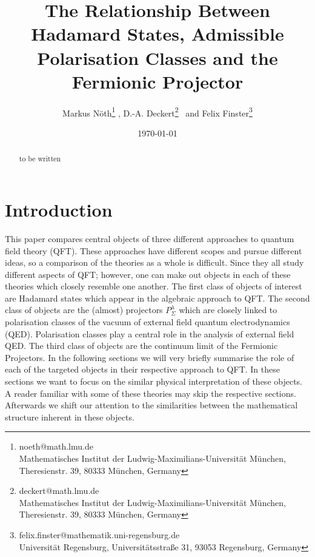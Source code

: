 \documentclass[a4paper,11pt]{article}
\begin{document}
\title{The Relationship Between Hadamard States, Admissible Polarisation Classes and the Fermionic Projector}

\author{Markus Nöth\thanks{noeth@math.lmu.de \\\tiny{Mathematisches Institut der Ludwig-Maximilians-Universit\"at M\"unchen,}
    \tiny{Theresienstr. 39, 80333 M\"unchen, Germany}}
	,
D.-A. Deckert\thanks{deckert@math.lmu.de \\ \tiny{Mathematisches Institut der Ludwig-Maximilians-Universit\"at M\"unchen,}
    \tiny{Theresienstr. 39, 80333 M\"unchen, Germany}}
	 ~and
Felix Finster\thanks{felix.finster@mathematik.uni-regensburg.de \\     \tiny{Universität Regensburg, Universitätsstraße 31, 93053 Regensburg, Germany}}
}
\date{\today}



\maketitle

\begin{abstract}
to be written
\end{abstract}

\section{Introduction}
This paper compares central objects of three different approaches to quantum field theory (QFT).
These approaches have different scopes and pursue different ideas, so a comparison of the theories as a whole is difficult.
Since they all study different aspects of QFT; however, one can make out objects in each of these theories which closely resemble
one another. The first class of objects of interest are Hadamard states which appear in the algebraic approach to 
QFT\cite{fulling1978singularity}. The second class of objects are the (almost) projectors \(P^\lambda_{\Sigma}\) which are 
closely linked to polarisation classes of the vacuum of external field quantum electrodynamics (QED). 
Polarisation classes play a central role in the analysis of external field QED\cite{ivp0, ivp1, ivp2}.
The third class of objects are the continuum limit of the Fermionic Projectors\cite{something}. 
In the following sections we will very briefly summarise the role of each of the targeted objects in their respective approach to QFT. 
In these sections we want to focus on the similar physical interpretation of these objects.
A reader familiar with some of these theories may skip the respective sections. 
Afterwards we shift our attention to the similarities between the mathematical structure inherent in these objects.
\end{document}
